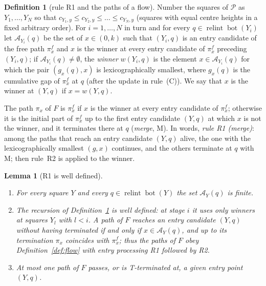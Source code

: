 \documentclass[11pt]{amsart}
\newcommand{\relint}{\operatorname{relint}}
\newcommand{\Bot}{\operatorname{bot}}
\newtheorem{lemma}[theorem]{Lemma}
\theoremstyle{definition}
\newtheorem{definition}[theorem]{Definition}
\theoremstyle{remark}
\numberwithin{equation}{section}
\begin{document}
\begin{definition}[rule R1 and the paths of a flow]\label{def:R1}
Number the squares of $\mathcal P$ as $Y_1,\dots,Y_N$ so that $c_{Y_1,y}\le c_{Y_2,y}\le\dots\le c_{Y_N,y}$ (squares with
equal centre heights in a fixed arbitrary order). For $i=1,\dots,N$ in turn and for every $q\in\relint\Bot(Y_i)$ let
$\mathcal A_{Y_i}(q)$ be the set of $x\in(0,k)$ such that $(Y_i,q)$ is an entry candidate of the free path
$\pi^f_x$ and $x$ is the winner at every entry candidate of $\pi^f_x$ preceding $(Y_i,q)$; if
$\mathcal A_{Y_i}(q)\ne\emptyset$, the \emph{winner} $w(Y_i,q)$ is the element $x\in\mathcal A_{Y_i}(q)$ for which the pair
$(g_x(q),x)$ is lexicographically smallest, where $g_x(q)$ is the cumulative gap of $\pi^f_x$ at $q$ (after the update
in rule~(C)). We say that $x$ is the winner at $(Y,q)$ if $x=w(Y,q)$.

The path $\pi_x$ of $F$ is $\pi^f_x$ if $x$ is the winner at every entry candidate of $\pi^f_x$; otherwise it is the
initial part of $\pi^f_x$ up to the first entry candidate $(Y,q)$ at which $x$ is not the winner, and it terminates
there at $q$ (\emph{merge}, M). In words, \emph{rule R1 (merge)}: among the paths that reach an entry candidate $(Y,q)$
alive, the one with the lexicographically smallest $(g,x)$ continues, and the others terminate at $q$ with M; then
rule~R2 is applied to the winner.
\end{definition}

\begin{lemma}[R1 is well defined]\label{lem:flows-R1}
\begin{enumerate}[label=(\alph*)]
\item For every square $Y$ and every $q\in\relint\Bot(Y)$ the set $\mathcal A_Y(q)$ is finite.
\item The recursion of Definition~\ref{def:R1} is well defined: at stage $i$ it uses only winners at squares $Y_l$ with
$l<i$. A path of $F$ reaches an entry candidate $(Y,q)$ without having terminated if and only if $x\in\mathcal A_Y(q)$, and
up to its termination $\pi_x$ coincides with $\pi^f_x$; thus the paths of $F$ obey Definition~\ref{def:flow} with
entry processing R1 followed by R2.
\item At most one path of $F$ passes, or is T-terminated at, a given entry point $(Y,q)$.
\end{enumerate}
\end{lemma}
\end{document}
